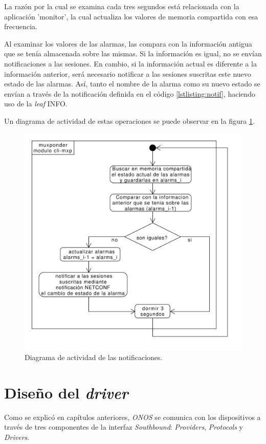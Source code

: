   La razón por la cual se examina cada tres segundos está relacionada con la aplicación 'monitor', la cual actualiza los valores de memoria compartida con esa frecuencia.

  Al examinar los valores de las alarmas, las compara con la información antigua que se tenía almacenada sobre las mismas. Si la información es igual, no se envían notificaciones a las sesiones. En cambio, si la información actual es diferente a la información anterior, será necesario notificar a las sesiones suscritas este nuevo estado de las alarmas. Así, tanto el nombre de la alarma como su nuevo estado se envían a través de la notificación definida en el código \ref{lstlisting:notif}, haciendo uso de la \textit{leaf} INFO.
  
  Un diagrama de actividad de estas operaciones se puede observar en la figura \ref{fig:actividad_modulo_notif}.

  \begin{figure}[H]
    \centering
    \includegraphics[scale=0.50]{Figures/actividad_modulo_notif.pdf}
    \caption{Diagrama de actividad de las notificaciones.}
    \label{fig:actividad_modulo_notif}
  \end{figure}


  \section{Diseño del \textit{driver}} 
  Como se explicó en capítulos anteriores, \textit{ONOS} se comunica con los dispositivos a través de tres componentes de la interfaz \textit{Southbound}: \textit{Providers}, \textit{Protocols} y \textit{Drivers}.
  

